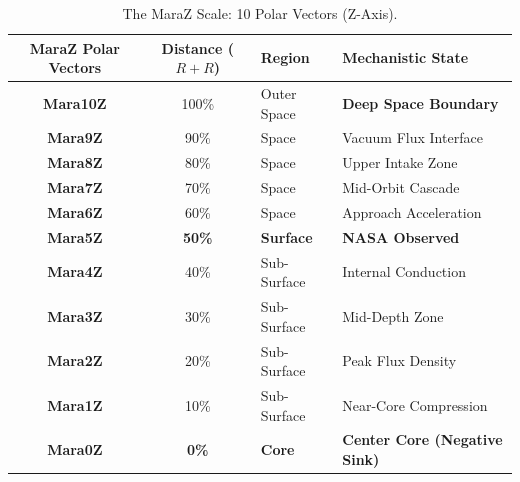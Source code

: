 \documentclass[11pt, a4paper]{article}
\begin{document}
\begin{table}[!t]
  \centering
  \begin{tabular}{c c l l} 
    \toprule
    \textbf{MaraZ Polar Vectors} & \textbf{Distance ($R+R$)} & \textbf{Region} & \textbf{Mechanistic State} \\
    \midrule
    \textbf{Mara10Z} & 100\% & Outer Space & \textbf{Deep Space Boundary} \\
    \textbf{Mara9Z} & 90\% & Space & Vacuum Flux Interface \\
    \textbf{Mara8Z} & 80\% & Space & Upper Intake Zone \\
    \textbf{Mara7Z} & 70\% & Space & Mid-Orbit Cascade \\
    \textbf{Mara6Z} & 60\% & Space & Approach Acceleration \\
    \midrule
    \textbf{Mara5Z} & \textbf{50\%} & \textbf{Surface} & \textbf{NASA Observed} \\
    \midrule
    \textbf{Mara4Z} & 40\% & Sub-Surface & Internal Conduction \\
    \textbf{Mara3Z} & 30\% & Sub-Surface & Mid-Depth Zone \\
    \textbf{Mara2Z} & 20\% & Sub-Surface & Peak Flux Density \\
    \textbf{Mara1Z} & 10\% & Sub-Surface & Near-Core Compression \\
    \textbf{Mara0Z} & \textbf{0\%} & \textbf{Core} & \textbf{Center Core (Negative Sink)} \\
    \bottomrule
  \end{tabular}
  \caption{The MaraZ Scale: 10 Polar Vectors (Z-Axis).}
\end{table}
\end{document}
